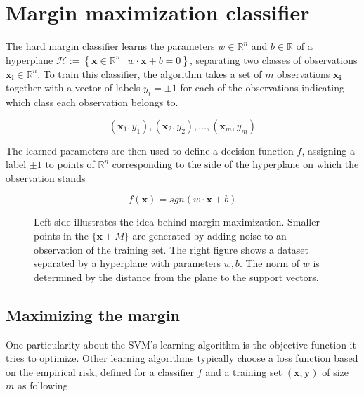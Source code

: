 \section {Margin maximization classifier}

The hard margin classifier learns the parameters $w \in \mathbb{R}^n$ and $b \in \mathbb{R}$ of a hyperplane $\mathscr{H} := \left\{ \mathbf{x} \in \mathbb{R}^n\ |\ w \cdot \mathbf{x} + b = 0\right\}$, separating two classes of observations $\mathbf{x_i} \in \mathbb{R}^n$. To train this classifier, the algorithm takes a set of $m$ observations $\mathbf{x_i}$ together with a vector of labels $y_i = \pm 1$ for each of the observations indicating which class each observation belongs to. 

\begin{equation*}
(\mathbf{x}_1, y_1), (\mathbf{x}_2, y_2), \dotsc, (\mathbf{x}_m, y_m)
\end{equation*}

The learned parameters are then used to define a decision function $f$, assigning a label $\pm 1$ to points of $\mathbb{R}^n$ corresponding to the side of the hyperplane on which the observation stands

\begin{equation}
  f(\mathbf{x}) = sgn(w \cdot \mathbf{x} + b)
\end{equation}

\begin{figure*}
  \begin{minipage}{.5\textwidth}
    \centering
    
  \end{minipage}%
  \begin{minipage}{.5\textwidth}
    \centering
    
  \end{minipage}

  \caption{
    Left side illustrates the idea behind margin maximization. Smaller points in the $\{ \mathbf{x} + M \}$ are generated by adding noise to an observation of the training set. The right figure shows a dataset separated by a hyperplane with parameters $w, b$. The norm of $w$ is determined by the distance from the plane to the support vectors.
  }
\end{figure*}

\subsection {Maximizing the margin}

One particularity about the SVM's learning algorithm is the objective function it tries to optimize. Other learning algorithms typically choose a loss function based on the empirical risk, defined for a classifier $f$ and a training set $(\mathbf{x}, \mathbf{y})$ of size $m$ as following

